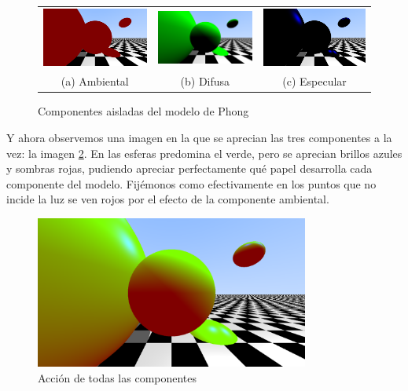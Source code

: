 \begin{figure}[ht]
    \centering
    \begin{tabular}{ccc}
      \includegraphics[width=5cm]{img/C8/solo-ambiental.png} &   \includegraphics[width=5cm]{img/C8/solo-difusa.png} &   \includegraphics[width=5cm]{img/C8/solo-especular.png} \\
    (a) Ambiental & (b) Difusa & (c) Especular \\[6pt]
    \end{tabular}
    \caption{Componentes aisladas del modelo de Phong}
    \label{fig:componentes-aisladas}
\end{figure}

Y ahora observemos una imagen en la que se aprecian las tres componentes a la vez: la imagen \ref{fig:todas-componentes}. En las esferas predomina el verde, pero se aprecian brillos azules y sombras rojas, pudiendo apreciar perfectamente qué papel desarrolla cada componente del modelo. Fijémonos como efectivamente en los puntos que no incide la luz se ven rojos por el efecto de la componente ambiental.

\begin{figure} [ht]
    \centering
    \includegraphics[width=9cm]{img/C8/todas-componentes.png}
    \caption{Acción de todas las componentes}
    \label{fig:todas-componentes}
\end{figure}

